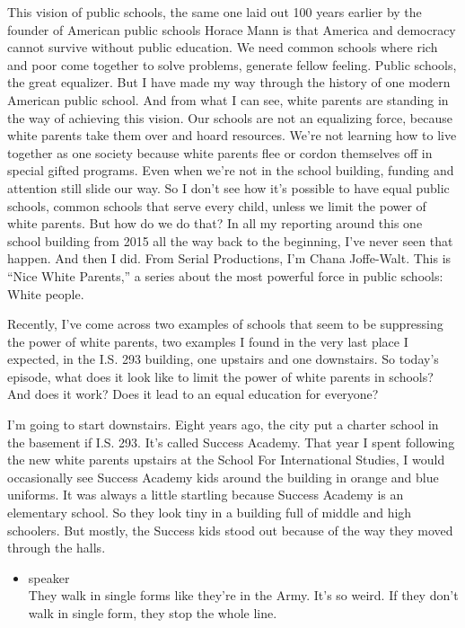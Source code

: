 This vision of public schools, the same one laid out 100 years earlier
by the founder of American public schools Horace Mann is that America
and democracy cannot survive without public education. We need common
schools where rich and poor come together to solve problems, generate
fellow feeling. Public schools, the great equalizer. But I have made my
way through the history of one modern American public school. And from
what I can see, white parents are standing in the way of achieving this
vision. Our schools are not an equalizing force, because white parents
take them over and hoard resources. We're not learning how to live
together as one society because white parents flee or cordon themselves
off in special gifted programs. Even when we're not in the school
building, funding and attention still slide our way. So I don't see how
it's possible to have equal public schools, common schools that serve
every child, unless we limit the power of white parents. But how do we
do that? In all my reporting around this one school building from 2015
all the way back to the beginning, I've never seen that happen. And then
I did. From Serial Productions, I'm Chana Joffe-Walt. This is ``Nice
White Parents,'' a series about the most powerful force in public
schools: White people.

Recently, I've come across two examples of schools that seem to be
suppressing the power of white parents, two examples I found in the very
last place I expected, in the I.S. 293 building, one upstairs and one
downstairs. So today's episode, what does it look like to limit the
power of white parents in schools? And does it work? Does it lead to an
equal education for everyone?

I'm going to start downstairs. Eight years ago, the city put a charter
school in the basement if I.S. 293. It's called Success Academy. That
year I spent following the new white parents upstairs at the School For
International Studies, I would occasionally see Success Academy kids
around the building in orange and blue uniforms. It was always a little
startling because Success Academy is an elementary school. So they look
tiny in a building full of middle and high schoolers. But mostly, the
Success kids stood out because of the way they moved through the halls.

\begin{itemize}
\tightlist
\item
  speaker\\
  They walk in single forms like they're in the Army. It's so weird. If
  they don't walk in single form, they stop the whole line.
\end{itemize}

